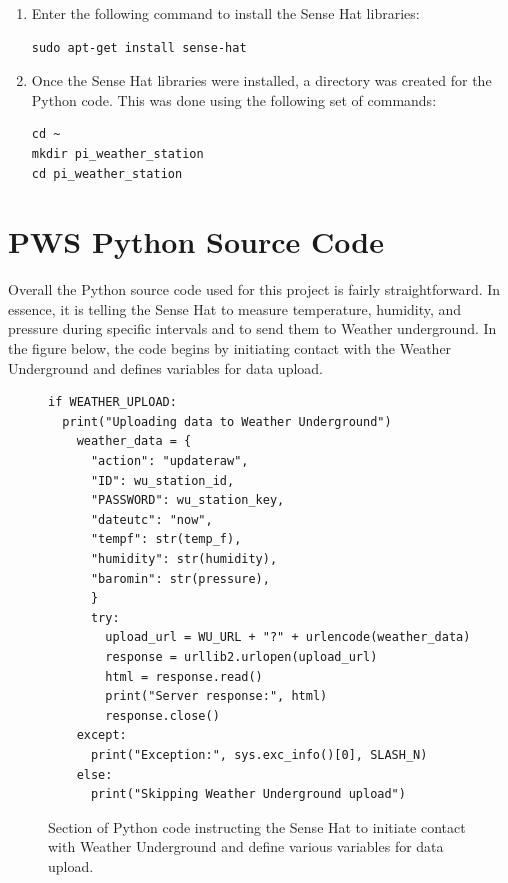 \documentclass[sigconf]{acmart}
\begin{document}
\begin{enumerate}
\item Enter the following command to install the Sense Hat libraries:

\begin{verbatim}
sudo apt-get install sense-hat
\end{verbatim}

\item Once the Sense Hat libraries were installed, a directory was created for the Python code. This was done using the following set of commands:

\begin{verbatim}
cd ~
mkdir pi_weather_station
cd pi_weather_station
\end{verbatim}

\end{enumerate}

\section{PWS Python Source Code}

Overall the Python source code used for this project is fairly straightforward\cite{WundergroundPython2017}. In essence, it is telling the Sense Hat to measure temperature, humidity, and pressure during specific intervals and to send them to Weather underground. In the figure below, the code begins by initiating contact with the Weather Underground and defines variables for data upload.

\begin{figure}[htb]
\begin{verbatim}
if WEATHER_UPLOAD:
  print("Uploading data to Weather Underground")
    weather_data = {
      "action": "updateraw",
      "ID": wu_station_id,
      "PASSWORD": wu_station_key,
      "dateutc": "now",
      "tempf": str(temp_f),
      "humidity": str(humidity),
      "baromin": str(pressure),
      }
      try:
        upload_url = WU_URL + "?" + urlencode(weather_data)
        response = urllib2.urlopen(upload_url)
        html = response.read()
        print("Server response:", html)
        response.close() 
    except:
      print("Exception:", sys.exc_info()[0], SLASH_N)
    else:
      print("Skipping Weather Underground upload")
\end{verbatim}
\caption{Section of Python code instructing the Sense Hat to initiate contact with Weather Underground and define various variables for data upload.}\label{F:upload}
\end{figure}
\end{document}

